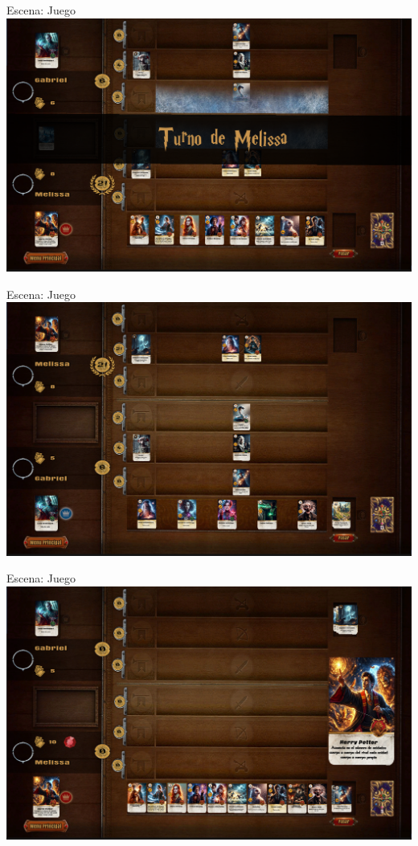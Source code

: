 \documentclass[a4paper, 12pt]{beamer}
\begin{document}
\begin{frame}{\textcolor{plata}{Escena: Juego}}
\includegraphics[scale = 0.2]{images/image7.png}
\end{frame}

\begin{frame}{\textcolor{plata}{Escena: Juego}}
\includegraphics[scale = 0.2]{images/image8.png}
\end{frame}

\begin{frame}{\textcolor{plata}{Escena: Juego}}
\includegraphics[scale = 0.2]{images/image9.png}
\end{frame}
\end{document}
